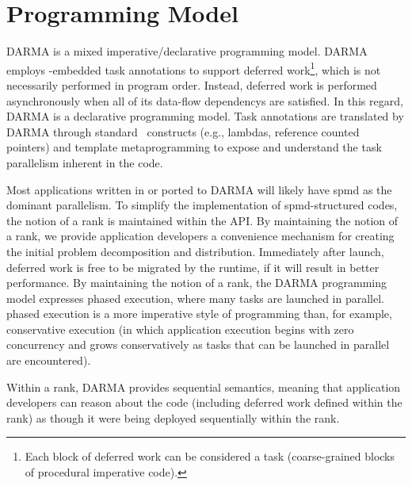 

\section{Programming Model}
\label{sec:programmingmodel}
\gls{DARMA} is a mixed \gls{imperative}/\gls{declarative} \gls{programming model}.
\gls{DARMA} employs \CC-embedded task annotations to support \gls{deferred
work}\footnote{Each block of
\gls{deferred work} can be considered a task (coarse-grained blocks of \gls{procedural} \gls{imperative} code).},  which is not necessarily performed in program order.   Instead,
\gls{deferred work} is performed asynchronously when all of its \glspl{data-flow dependency} are
satisfied. In this regard,  \gls{DARMA} is a \gls{declarative} \gls{programming
model}.  Task annotations are translated by \gls{DARMA} through standard
\CC\ constructs (e.g., \glspl{lambda}, \glspl{reference counted pointer}) and \gls{template metaprogramming} to
expose and understand the \gls{task parallelism} inherent in the code.


Most applications written in or ported to \gls{DARMA} will likely have \gls{spmd} as the dominant parallelism.
To simplify the implementation of \gls{spmd}-structured codes, the notion of a \gls{rank} is maintained within the \gls{API}.   
By maintaining the notion of a \gls{rank}, we provide application developers a convenience mechanism for creating
the initial problem decomposition and distribution.  
Immediately after launch, \gls{deferred work} is free to be migrated by the runtime, if it will result in
better performance.
By maintaining the notion of a \gls{rank}, the \gls{DARMA} \gls{programming model} expresses \gls{phased execution},
where many tasks are launched in parallel.  \Gls{phased execution} is a more
\gls{imperative} style of programming than, for example, \gls{conservative execution} 
(in which application execution begins with zero \gls{concurrency}
and grows conservatively as tasks that can be launched in parallel are
encountered).

Within a \gls{rank}, \gls{DARMA} provides \gls{sequential semantics}, 
meaning that application developers can reason about the code (including
\gls{deferred work} defined within the \gls{rank}) as though it were being deployed sequentially within the \gls{rank}.   



